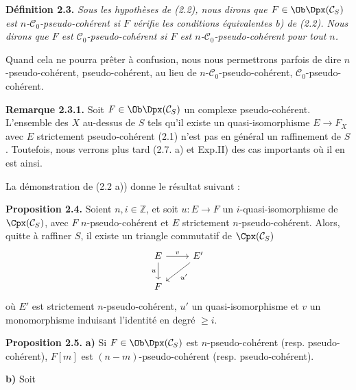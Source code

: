 \textbf{Définition 2.3.} \emph{Sous les hypothèses de (2.2), nous dirons que \(F\in\Ob\Dpx(\mathcal C_S)\) est \(n\)-\(\mathcal C_0\)-pseudo-cohérent si \(F\) vérifie les conditions équivalentes b) de (2.2). Nous dirons que \(F\) est \(\mathcal C_0\)-pseudo-cohérent si \(F\) est \(n\)-\(\mathcal C_0\)-pseudo-cohérent pour tout \(n\).}

Quand cela ne pourra prêter à confusion, nous nous permettrons parfois de dire \(n\)-pseudo-cohérent, pseudo-cohérent, au lieu de \(n\)-\(\mathcal C_0\)-pseudo-cohérent, \(\mathcal C_0\)-pseudo-cohérent.

\textbf{Remarque 2.3.1.} Soit \(F\in\Ob\Dpx(\mathcal C_S)\) un complexe pseudo-cohérent. L'ensemble des \(X\) au-dessus de \(S\) tels qu'il existe un quasi-isomorphisme \(E\longrightarrow F_X\) avec \(E\) strictement pseudo-cohérent (2.1) n'est pas en général un raffinement de \(S\). Toutefois, nous verrons plus tard (2.7. a) et Exp.II) des cas importants où il en est ainsi.

La démonstration de (2.2 a)) donne le résultat suivant :

\textbf{Proposition 2.4.} Soient \(n,i\in\mathbb Z\), et soit \(u:E\to F\) un \(i\)-quasi-isomorphisme de \(\Cpx(\mathcal C_S)\), avec \(F\) \(n\)-pseudo-cohérent et \(E\) strictement \(n\)-pseudo-cohérent. Alors, quitte à raffiner \(S\), il existe un triangle commutatif de \(\Cpx(\mathcal C_S)\)
\[
\begin{tikzcd}
E \arrow[r,"v"] \arrow[d,"u"'] & E' \arrow[dl,"u'"]\\
F &
\end{tikzcd}
\]
où \(E'\) est strictement \(n\)-pseudo-cohérent, \(u'\) un quasi-isomorphisme et \(v\) un monomorphisme induisant l'identité en degré \(\geq i\).

\textbf{Proposition 2.5.} \textbf{a)} Si \(F\in\Ob\Dpx(\mathcal C_S)\) est \(n\)-pseudo-cohérent (resp. pseudo-cohérent), \(F[m]\) est \((n-m)\)-pseudo-cohérent (resp. pseudo-cohérent).

\textbf{b)} Soit
